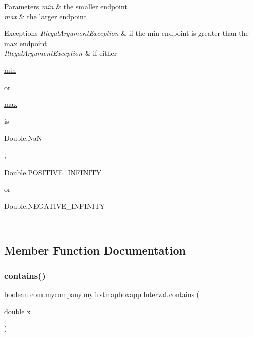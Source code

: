 \begin{DoxyParams}{Parameters}
{\em min} & the smaller endpoint \\
\hline
{\em max} & the larger endpoint \\
\hline
\end{DoxyParams}

\begin{DoxyExceptions}{Exceptions}
{\em Illegal\+Argument\+Exception} & if the min endpoint is greater than the max endpoint \\
\hline
{\em Illegal\+Argument\+Exception} & if either
\begin{DoxyCode}
\hyperlink{classcom_1_1mycompany_1_1myfirstmapboxapp_1_1_interval_ad537811e98caba58c27071acced4c252}{min} 
\end{DoxyCode}
 or
\begin{DoxyCode}
\hyperlink{classcom_1_1mycompany_1_1myfirstmapboxapp_1_1_interval_a8f959bd89864640b4febcbfebe376f31}{max} 
\end{DoxyCode}
 is
\begin{DoxyCode}
Double.NaN 
\end{DoxyCode}
 ,
\begin{DoxyCode}
Double.POSITIVE\_INFINITY 
\end{DoxyCode}
 or 
\begin{DoxyCode}
Double.NEGATIVE\_INFINITY 
\end{DoxyCode}
 \\
\hline
\end{DoxyExceptions}


\subsection{Member Function Documentation}
\mbox{\label{classcom_1_1mycompany_1_1myfirstmapboxapp_1_1_interval_a4b110a2f87d5c8aed0f3854804483658}} 
\subsubsection{\texorpdfstring{contains()}{contains()}}
{\footnotesize\ttfamily boolean com.\+mycompany.\+myfirstmapboxapp.\+Interval.\+contains (\begin{DoxyParamCaption}\item[{double}]{x }\end{DoxyParamCaption})\hspace{0.3cm}{\ttfamily [inline]}}

